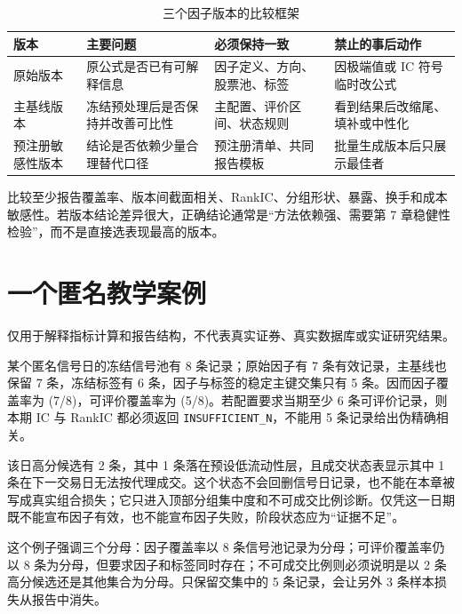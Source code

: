 \begin{table}[htbp]
  \centering
  \small
  \caption{三个因子版本的比较框架}
  \label{tab:ch06-version-comparison}
  \begin{tabularx}{\textwidth}{p{2.3cm} p{3.0cm} p{3.1cm} Y}
    \toprule
    版本 & 主要问题 & 必须保持一致 & 禁止的事后动作 \\
    \midrule
    原始版本 & 原公式是否已有可解释信息 & 因子定义、方向、股票池、标签 & 因极端值或 IC 符号临时改公式 \\
    主基线版本 & 冻结预处理后是否保持并改善可比性 & 主配置、评价区间、状态规则 & 看到结果后改缩尾、填补或中性化 \\
    预注册敏感性版本 & 结论是否依赖少量合理替代口径 & 预注册清单、共同报告模板 & 批量生成版本后只展示最佳者 \\
    \bottomrule
  \end{tabularx}
\end{table}

比较至少报告覆盖率、版本间截面相关、RankIC、分组形状、暴露、换手和成本敏感性。若版本结论差异很大，正确结论通常是“方法依赖强、需要第 7 章稳健性检验”，而不是直接选表现最高的版本。

\section{一个匿名教学案例}

\begin{casebox}
仅用于解释指标计算和报告结构，不代表真实证券、真实数据库或实证研究结果。

某个匿名信号日的冻结信号池有 8 条记录；原始因子有 7 条有效记录，主基线也保留 7 条，冻结标签有 6 条，因子与标签的稳定主键交集只有 5 条。因而因子覆盖率为 (7/8)，可评价覆盖率为 (5/8)。若配置要求当期至少 6 条可评价记录，则本期 IC 与 RankIC 都必须返回
\texttt{INSUFFICIENT\_N}，不能用 5 条记录给出伪精确相关。

该日高分候选有 2 条，其中 1 条落在预设低流动性层，且成交状态表显示其中 1 条在下一交易日无法按代理成交。这个状态不会回删信号日记录，也不能在本章被写成真实组合损失；它只进入顶部分组集中度和不可成交比例诊断。仅凭这一日期既不能宣布因子有效，也不能宣布因子失败，阶段状态应为“证据不足”。
\end{casebox}

这个例子强调三个分母：因子覆盖率以 8 条信号池记录为分母；可评价覆盖率仍以 8 条为分母，但要求因子和标签同时存在；不可成交比例则必须说明是以 2 条高分候选还是其他集合为分母。只保留交集中的 5 条记录，会让另外 3 条样本损失从报告中消失。

